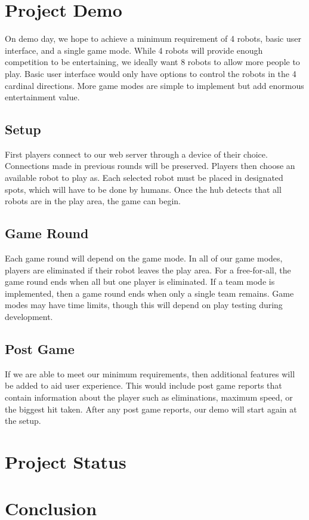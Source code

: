 \documentclass[11pt]{ieeeconf}
\begin{document}
\section{Project Demo}

On demo day, we hope to achieve a minimum requirement of 4 robots, basic user interface, and a single game mode. While 4 robots will provide enough competition to be entertaining, we ideally want 8 robots to allow more people to play. Basic user interface would only have options to control the robots in the 4 cardinal directions. More game modes are simple to implement but add enormous entertainment value.

\subsection{Setup}
First players connect to our web server through a device of their choice. Connections made in previous rounds will be preserved. Players then choose an available robot to play as. Each selected robot must be placed in designated spots, which will have to be done by humans. Once the hub detects that all robots are in the play area, the game can begin. 

\subsection{Game Round}
Each game round will depend on the game mode. In all of our game modes, players are eliminated if their robot leaves the play area. For a free-for-all, the game round ends when all but one player is eliminated. If a team mode is implemented, then a game round ends when only a single team remains. Game modes may have time limits, though this will depend on play testing during development.

\subsection{Post Game}
If we are able to meet our minimum requirements, then additional features will be added to aid user experience. This would include post game reports that contain information about the player such as eliminations, maximum speed, or the biggest hit taken. After any post game reports, our demo will start again at the setup.

\section{Project Status}

\section{Conclusion}



\end{document}
